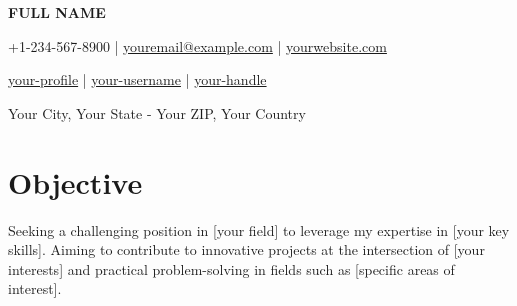 \documentclass[a4paper,11pt]{article}
\newcommand{\headerfontiii}{\fontfamily{ppl}\selectfont} %
\begin{document}





\headerfontiii






\begin{center}
    {\Huge\textbf{FULL NAME}}
\end{center}
\vspace{-6mm}

\begin{center}
    \small{
    +1-234-567-8900 | \href{mailto:youremail@example.com}{youremail@example.com} | 
    \href{https://www.yourwebsite.com/}{yourwebsite.com}
    }
\end{center}
\vspace{-6mm}

\begin{center}
    \small{
    \socialicon{\faLinkedin} \href{https://www.linkedin.com/in/your-profile/}{your-profile} | 
    \socialicon{\faGithub} \href{https://github.com/your-username}{your-username} |
    \socialicon{\faTwitter} \href{https://twitter.com/your-handle}{your-handle}
    }
\end{center}
\vspace{-6mm}
\begin{center}
    \small{Your City, Your State - Your ZIP, Your Country}
\end{center}

\vspace{-4mm}

\section{\textbf{Objective}}
\vspace{1mm}
\small{
Seeking a challenging position in [your field] to leverage my expertise in [your key skills]. Aiming to contribute to innovative projects at the intersection of [your interests] and practical problem-solving in fields such as [specific areas of interest].
}
\vspace{-2mm}
\end{document}
